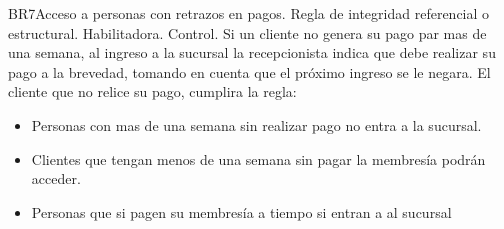 \begin{BussinesRule}{BR7}{Acceso a personas con retrazos en pagos.}
	\BRitem[Tipo:] Regla de integridad referencial o estructural.
	\BRitem[Clase:] Habilitadora. 
	\BRitem[Nivel:] Control. %
	\BRitem[Descripción:] Si un cliente no genera su pago par mas de una semana, al ingreso a la sucursal la recepcionista indica que debe realizar su pago a la brevedad, tomando en cuenta que el próximo ingreso se le negara.
	 El cliente que no relice su pago, cumplira la regla:
		\begin{itemize}
			\item Personas con mas de una semana sin realizar pago no entra a la sucursal.
			\item Clientes que tengan menos de una semana sin pagar la membresía podrán acceder.
		\end{itemize}
	
		\begin{itemize}
			\item Personas que si pagen su membresía a tiempo si entran a al sucursal
		\end{itemize}
	
\end{BussinesRule}

